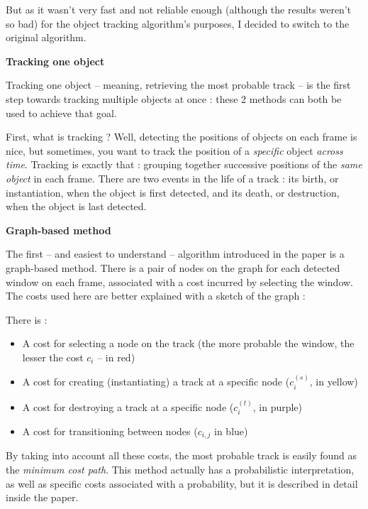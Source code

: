 \documentclass{letter}
\newcommand{\section}[1]{\medskip\bigskip

\noindent\textbf{\LARGE #1}}
\newcommand{\subsection}[1]{\medskip\bigskip

\noindent\textbf{\Large #1}}
\newcommand{\tmem}[1]{{\em #1\/}}
\begin{document}
But as it wasn't very fast and not reliable enough (although the results
weren't so bad) for the object tracking algorithm's purposes, I decided to
switch to the original algorithm.

\section{Tracking one object}

Tracking one object -- meaning, retrieving the most probable track -- is the
first step towards tracking multiple objects at once : these 2 methods can
both be used to achieve that goal.

First, what is tracking ? Well, detecting the positions of objects on each
frame is nice, but sometimes, you want to track the position of a
{\tmem{specific}} object {\tmem{across time}}. Tracking is exactly that :
grouping together successive positions of the {\tmem{same object}} in each
frame. There are two events in the life of a track : its birth, or
instantiation, when the object is first detected, and its death, or
destruction, when the object is last detected.

\subsection{Graph-based method}

The first -- and easiest to understand -- algorithm introduced in the paper is
a graph-based method. There is a pair of nodes on the graph for each detected
window on each frame, associated with a cost incurred by selecting the window.
The costs used here are better explained with a sketch of the graph :

\begin{center}
\end{center}

There is :
\begin{itemize}
  \item A cost for selecting a node on the track (the more probable the
  window, the lesser the cost $c_i$ -- in red)
  
  \item A cost for creating (instantiating) a track at a specific node
  ($c_i^{\left( s \right)}$, in yellow)
  
  \item A cost for destroying a track at a specific node ($c_i^{\left( t
  \right)}$, in purple)
  
  \item A cost for transitioning between nodes ($c_{i, j}$ in blue)
\end{itemize}
By taking into account all these costs, the most probable track is easily
found as the {\tmem{minimum cost path}}. This method actually has a
probabilistic interpretation, as well as specific costs associated with a
probability, but it is described in detail inside the paper.
\end{document}

